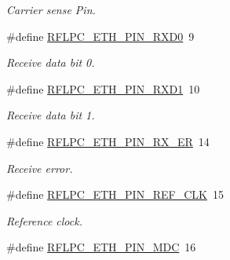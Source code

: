 \begin{DoxyCompactItemize}
\begin{DoxyCompactList}\small\item\em Carrier sense Pin. \end{DoxyCompactList}\item 
\hypertarget{group__eth_ga56dc2c8508fc2538f83fab449ad0ba9d}{\#define \hyperlink{group__eth_ga56dc2c8508fc2538f83fab449ad0ba9d}{R\-F\-L\-P\-C\-\_\-\-E\-T\-H\-\_\-\-P\-I\-N\-\_\-\-R\-X\-D0}~9}\label{group__eth_ga56dc2c8508fc2538f83fab449ad0ba9d}

\begin{DoxyCompactList}\small\item\em Receive data bit 0. \end{DoxyCompactList}\item 
\hypertarget{group__eth_ga66ba35d412b2776cd451a3d2b5ad1be3}{\#define \hyperlink{group__eth_ga66ba35d412b2776cd451a3d2b5ad1be3}{R\-F\-L\-P\-C\-\_\-\-E\-T\-H\-\_\-\-P\-I\-N\-\_\-\-R\-X\-D1}~10}\label{group__eth_ga66ba35d412b2776cd451a3d2b5ad1be3}

\begin{DoxyCompactList}\small\item\em Receive data bit 1. \end{DoxyCompactList}\item 
\hypertarget{group__eth_ga386ba6e30aef14a859cbaf1974cb36ed}{\#define \hyperlink{group__eth_ga386ba6e30aef14a859cbaf1974cb36ed}{R\-F\-L\-P\-C\-\_\-\-E\-T\-H\-\_\-\-P\-I\-N\-\_\-\-R\-X\-\_\-\-E\-R}~14}\label{group__eth_ga386ba6e30aef14a859cbaf1974cb36ed}

\begin{DoxyCompactList}\small\item\em Receive error. \end{DoxyCompactList}\item 
\hypertarget{group__eth_gaeee370fff48e5c0d8bc3f0ef32de17b2}{\#define \hyperlink{group__eth_gaeee370fff48e5c0d8bc3f0ef32de17b2}{R\-F\-L\-P\-C\-\_\-\-E\-T\-H\-\_\-\-P\-I\-N\-\_\-\-R\-E\-F\-\_\-\-C\-L\-K}~15}\label{group__eth_gaeee370fff48e5c0d8bc3f0ef32de17b2}

\begin{DoxyCompactList}\small\item\em Reference clock. \end{DoxyCompactList}\item 
\hypertarget{group__eth_ga1cb5f06c0a2c26ed3318d66f562d3e54}{\#define \hyperlink{group__eth_ga1cb5f06c0a2c26ed3318d66f562d3e54}{R\-F\-L\-P\-C\-\_\-\-E\-T\-H\-\_\-\-P\-I\-N\-\_\-\-M\-D\-C}~16}\label{group__eth_ga1cb5f06c0a2c26ed3318d66f562d3e54}


\end{DoxyCompactItemize}
